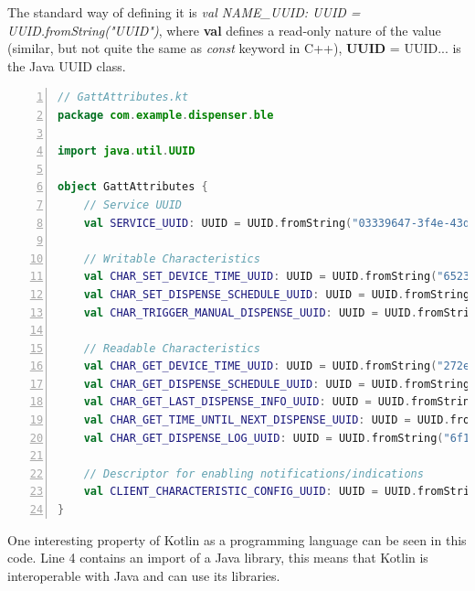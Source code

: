 The standard way of defining it is \textit{val NAME\_UUID: UUID = UUID.fromString("UUID")}, where \textbf{val} defines a read-only nature of the value (similar, but not quite the same as \textit{const} keyword in C++), \textbf{UUID} = UUID... is the Java UUID class.



\begin{lstlisting}[style=kotlinstyle,caption={\ac{GATT} attributes defined in a separate file},label={lst:GATTs},float=htbp,language=Kotlin,numbers=left]
// GattAttributes.kt
package com.example.dispenser.ble

import java.util.UUID

object GattAttributes {
	// Service UUID
	val SERVICE_UUID: UUID = UUID.fromString("03339647-3f4e-43df-abff-fac54287cf1a")
	
	// Writable Characteristics
	val CHAR_SET_DEVICE_TIME_UUID: UUID = UUID.fromString("65232f1d-618a-4268-9050-0548142a4536")
	val CHAR_SET_DISPENSE_SCHEDULE_UUID: UUID = UUID.fromString("999c584e-06c0-49a1-995a-66b7c802ac1b")
	val CHAR_TRIGGER_MANUAL_DISPENSE_UUID: UUID = UUID.fromString("36bb95f2-e57e-4db9-b9aa-fb6541ee784e")
	
	// Readable Characteristics
	val CHAR_GET_DEVICE_TIME_UUID: UUID = UUID.fromString("272ee276-e37e-4d78-8c5e-bb7225d35074")
	val CHAR_GET_DISPENSE_SCHEDULE_UUID: UUID = UUID.fromString("b53c2ed4-ae26-476d-8414-011a025dddfc")
	val CHAR_GET_LAST_DISPENSE_INFO_UUID: UUID = UUID.fromString("40d3b5d8-5480-4b7b-a115-5fe86bf17d7d")
	val CHAR_GET_TIME_UNTIL_NEXT_DISPENSE_UUID: UUID = UUID.fromString("4b14acc4-768a-43e1-9d6c-0d97307e2666")
	val CHAR_GET_DISPENSE_LOG_UUID: UUID = UUID.fromString("6f182da7-c5a8-40ab-a637-f97ed6b5777b")
	
	// Descriptor for enabling notifications/indications
	val CLIENT_CHARACTERISTIC_CONFIG_UUID: UUID = UUID.fromString("00002902-0000-1000-8000-00805f9b34fb")
}
\end{lstlisting}
One interesting property of Kotlin as a programming language can be seen in this code. Line 4 contains an import of a Java library, this means that Kotlin is interoperable with Java and can use its libraries.

